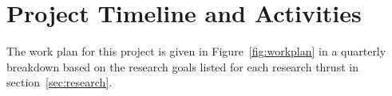 
\section{Project Timeline and Activities}
\label{sec:man}

The work plan for this project is given in Figure~\ref{fig:workplan} in a quarterly breakdown based on the research goals listed for each research thrust in section~\ref{sec:research}.

\begin{figure*}
  \centering
\caption{The proposed work plan split into quarterly tasks for the duration of the grant period.}
\label{fig:workplan}
\end{figure*}

